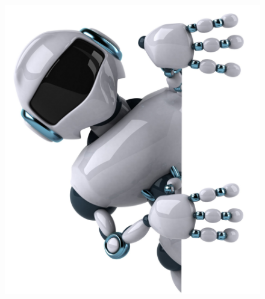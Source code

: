 \documentclass[10pt]{beamer}
\begin{document}

\begin{frame}
\begin{figure}[hbtp]
\centering
\includegraphics[scale=0.1]{figures/bye-bye.jpeg}
\end{figure}
\end{frame}

\end{document}
